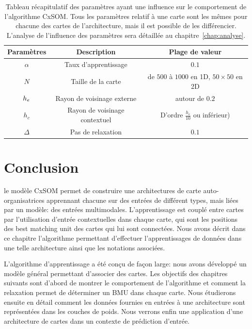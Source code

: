 \begin{table}
\caption{Tableau récapitulatif des paramètres ayant une influence sur le comportement de l'algorithme CxSOM. Tous les paramètres relatif à une carte sont les mêmes pour chacune des cartes de l'architecture, mais il est possible de les différencier. L'analyse de l'influence des paramètres sera détaillée au chapitre~\ref{chap:analyse}.}\label{tab:params}
\vspace{3mm}
\begin{tabular}{|c|c|c|}
\hline
Paramètres & Description & Plage de valeur \\
\hline
$\alpha$ & Taux d'apprentissage & $0.1$ \\
$N$ & Taille de la carte & de $500$ à $1000$ en 1D, $50 \times 50$ en 2D \\
$h_e$ & Rayon de voisinage externe & autour de $0.2$ \\
$h_c$ & Rayon de voisinage contextuel & D'ordre $\frac{h_e}{10}$ ou inférieur) \\
$\Delta$ & Pas de relaxation & $0.1$ \\
\hline
\end{tabular}
\end{table}


\section{Conclusion}

le modèle CxSOM permet de construire une architectures de carte auto-organisatrices apprennant chacune sur des entrées de différent types, mais liées par un modèle: des entrées multimodales. L'apprentissage est couplé entre cartes par l'utilisation d'entrée contextuelles dans chaque carte, qui sont les positions des best matching unit des cartes qui lui sont connectées. Nous avons décrit dans ce chapitre l'algorithme permettant d'effectuer l'apprentissages de données dans une telle architecture ainsi que les notations associées.

L'algorithme d'apprentissage a été conçu de façon large: nous avons développé un modèle général permettant d'associer des cartes. Les objectifs des chapitres suivants sont d'abord de montrer le comportement de l'algorithme et comment la relaxation permet de déterminer un BMU dans chaque carte. Nous étudierons ensuite en détail comment les données fournies en entrées à une architecture sont représentées dans les couches de poids. Nous verrons enfin une application d'une architecture de cartes dans un contexte de prédiction d'entrée.

